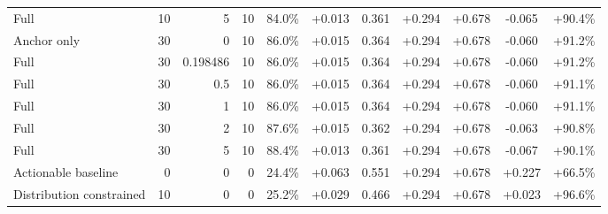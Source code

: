 \begin{table}[htbp]
\begin{tabular}{lrrrccccccc}
Full & 10 & 5 & 10 & 84.0\% & +0.013 & 0.361 & +0.294 & +0.678 & -0.065 & +90.4\% \\
Anchor only & 30 & 0 & 10 & 86.0\% & +0.015 & 0.364 & +0.294 & +0.678 & -0.060 & +91.2\% \\
Full & 30 & 0.198486 & 10 & 86.0\% & +0.015 & 0.364 & +0.294 & +0.678 & -0.060 & +91.2\% \\
Full & 30 & 0.5 & 10 & 86.0\% & +0.015 & 0.364 & +0.294 & +0.678 & -0.060 & +91.1\% \\
Full & 30 & 1 & 10 & 86.0\% & +0.015 & 0.364 & +0.294 & +0.678 & -0.060 & +91.1\% \\
Full & 30 & 2 & 10 & 87.6\% & +0.015 & 0.362 & +0.294 & +0.678 & -0.063 & +90.8\% \\
Full & 30 & 5 & 10 & 88.4\% & +0.013 & 0.361 & +0.294 & +0.678 & -0.067 & +90.1\% \\
Actionable baseline & 0 & 0 & 0 & 24.4\% & +0.063 & 0.551 & +0.294 & +0.678 & +0.227 & +66.5\% \\
Distribution constrained & 10 & 0 & 0 & 25.2\% & +0.029 & 0.466 & +0.294 & +0.678 & +0.023 & +96.6\% \\
\bottomrule
\end{tabular}
\end{table}